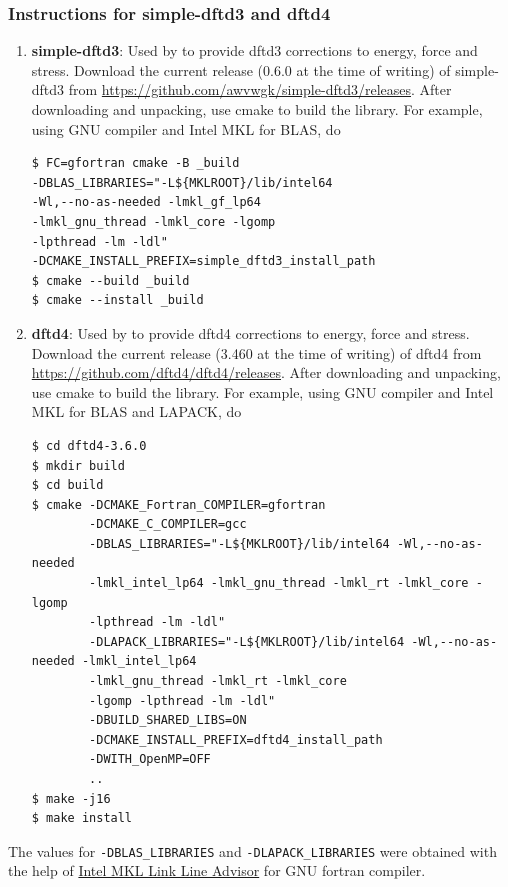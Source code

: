 \subsubsection{Instructions for simple-dftd3 and dftd4}

\begin{enumerate}
	\item   {\bf simple-dftd3}: Used by \dftfe{} to provide dftd3 corrections to energy, force and stress. Download the current release (0.6.0 at the time of writing) of simple-dftd3 from \url{https://github.com/awvwgk/simple-dftd3/releases}. After downloading and unpacking, use cmake to build the library. For example, using GNU compiler and Intel MKL for BLAS, do
\begin{verbatim}
$ FC=gfortran cmake -B _build 
-DBLAS_LIBRARIES="-L${MKLROOT}/lib/intel64 
-Wl,--no-as-needed -lmkl_gf_lp64 
-lmkl_gnu_thread -lmkl_core -lgomp 
-lpthread -lm -ldl" 
-DCMAKE_INSTALL_PREFIX=simple_dftd3_install_path
$ cmake --build _build
$ cmake --install _build 
\end{verbatim}
	\item   {\bf dftd4}: Used by \dftfe{} to provide dftd4 corrections to energy, force and stress. Download the current release (3.460 at the time of writing) of dftd4 from \url{https://github.com/dftd4/dftd4/releases}. After downloading and unpacking, use cmake to build the library. For example, using GNU compiler and Intel MKL for BLAS and LAPACK, do
\begin{verbatim}
$ cd dftd4-3.6.0
$ mkdir build 
$ cd build
$ cmake -DCMAKE_Fortran_COMPILER=gfortran
        -DCMAKE_C_COMPILER=gcc
        -DBLAS_LIBRARIES="-L${MKLROOT}/lib/intel64 -Wl,--no-as-needed
        -lmkl_intel_lp64 -lmkl_gnu_thread -lmkl_rt -lmkl_core -lgomp 
        -lpthread -lm -ldl" 
        -DLAPACK_LIBRARIES="-L${MKLROOT}/lib/intel64 -Wl,--no-as-needed -lmkl_intel_lp64
        -lmkl_gnu_thread -lmkl_rt -lmkl_core 
        -lgomp -lpthread -lm -ldl"
        -DBUILD_SHARED_LIBS=ON 
        -DCMAKE_INSTALL_PREFIX=dftd4_install_path
        -DWITH_OpenMP=OFF
        ..
$ make -j16
$ make install
\end{verbatim}
\end{enumerate}
The values for \verb|-DBLAS_LIBRARIES| and \verb|-DLAPACK_LIBRARIES| were obtained with the help of \href{https://software.intel.com/en-us/articles/intel-mkl-link-line-advisor}{Intel MKL Link Line Advisor} for GNU fortran compiler.\\ 


